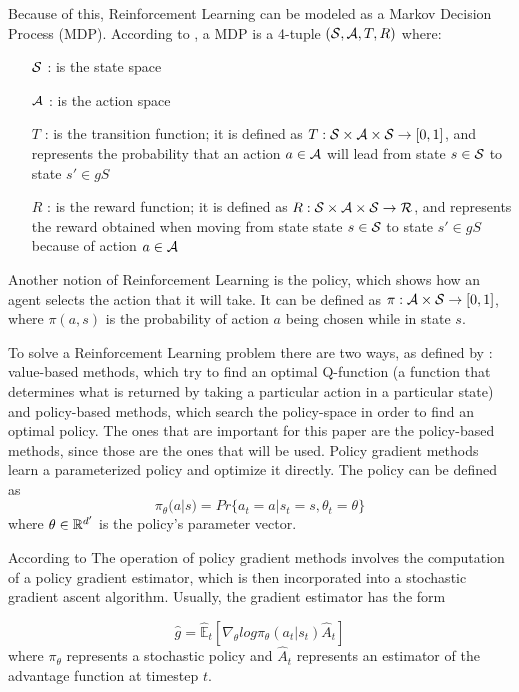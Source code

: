 Because of this, Reinforcement Learning can be modeled as a Markov Decision Process (MDP). According to \cite{Bellman_MDP}, a MDP is a 4-tuple $({\mathcal{S}}, {\mathcal{A}}, T, R)$ where:
\begin{itemize}
    \item [${\mathcal{S}}$]: is the state space
    \item [${\mathcal{A}}$]: is the action space
    \item [$T$]: is the transition function; it is defined as $T: {\mathcal{S}} \times {\mathcal{A}} \times {\mathcal{S}} \rightarrow [0, 1]$, and represents the probability that an action $a \in {\mathcal{A}}$ will lead from state $s \in {\mathcal{S}}$ to state $s' \in gS$
    \item [$R$]: is the reward function; it is defined as $R: {\mathcal{S}} \times {\mathcal{A}} \times {\mathcal{S}} \rightarrow {\mathcal{R}}$, and represents the reward obtained when moving from state state $s \in {\mathcal{S}}$ to state $s' \in gS$ because of action $a \in {\mathcal{A}}$
\end{itemize}

Another notion of Reinforcement Learning is the policy, which shows how an agent selects the action that it will take. It can be defined as $\pi: {\mathcal{A}} \times {\mathcal{S}} \rightarrow [0, 1]$, where $\pi(a, s)$ is the probability of action $a$ being chosen while in state $s$.

To solve a Reinforcement Learning problem there are two ways, as defined by \cite{yang2021overviewmultiagentrl}: value-based methods, which try to find an optimal Q-function (a function that determines what is returned by taking a particular action in a particular state) and policy-based methods, which search the policy-space in order to find an optimal policy. The ones that are important for this paper are the policy-based methods, since those are the ones that will be used. Policy gradient methods learn a parameterized policy and optimize it directly. The policy can be defined as 
\begin{equation} \label{policy_eq:1}
    \pi_{\theta} (a | s) = Pr\{a_t = a | s_t = s, \theta_{t} = \theta\}
\end{equation}
where $\theta \in {\mathbb{R}}^{d'}$ is the policy's parameter vector.




According to \cite{schulman2017ppo} The operation of policy gradient methods involves the computation of a policy gradient estimator, which is then incorporated into a stochastic gradient ascent algorithm. Usually, the gradient estimator has the form 

\begin{equation}
    \hat{g} = \hat{\mathbb{E}}_{t} [\nabla_{\theta} log \pi_{\theta}(a_t | s_t) \hat{A}_{t}]    
\end{equation}
where $\pi_{\theta}$ represents a stochastic policy and $\hat{A}_{t}$ represents an estimator of the advantage function at timestep $t$.

